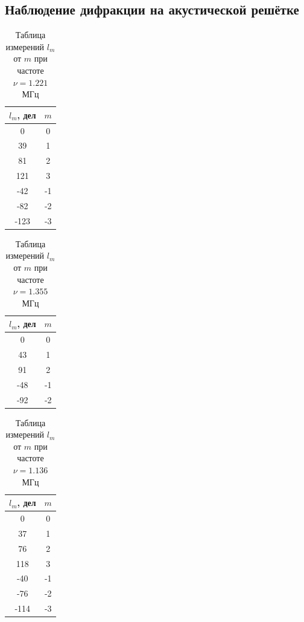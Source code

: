 \documentclass[12pt]{article}
\begin{document}
\subsection*{Наблюдение дифракции на акустической решётке}
\begin{table}[h!]
	\centering
	\begin{tabular}{|c|c|}
	\hline
		$l_m$, дел & $m$ \\
	\hline
		0 & 0 \\
	\hline
		39 & 1 \\
	\hline
		81 & 2 \\
	\hline
		121 & 3 \\
	\hline
		-42 & -1 \\
	\hline
		-82 & -2 \\
	\hline
		-123 & -3 \\
	\hline
	\end{tabular}
	\caption{Таблица измерений $l_m$ от $m$ при частоте $\nu = 1.221$ МГц}
\end{table}
\begin{table}[h!]
	\centering
	\begin{tabular}{|c|c|}
	\hline
		$l_m$, дел & $m$ \\
	\hline
		0 & 0 \\
	\hline
		43 & 1 \\
	\hline
		91 & 2 \\
	\hline
		-48 & -1 \\
	\hline
		-92 & -2 \\
	\hline
	\end{tabular}
	\caption{Таблица измерений $l_m$ от $m$ при частоте $\nu = 1.355$ МГц}
\end{table}
\begin{table}[h!]
	\centering
	\begin{tabular}{|c|c|}
	\hline
		$l_m$, дел & $m$ \\
	\hline
		0 & 0 \\
	\hline
		37 & 1 \\
	\hline
		76 & 2 \\
	\hline
		118 & 3 \\
	\hline
		-40 & -1 \\
	\hline
		-76 & -2 \\
	\hline
		-114 & -3 \\
	\hline
	\end{tabular}
	\caption{Таблица измерений $l_m$ от $m$ при частоте $\nu = 1.136$ МГц}
\end{table}
\newpage
\end{document}
